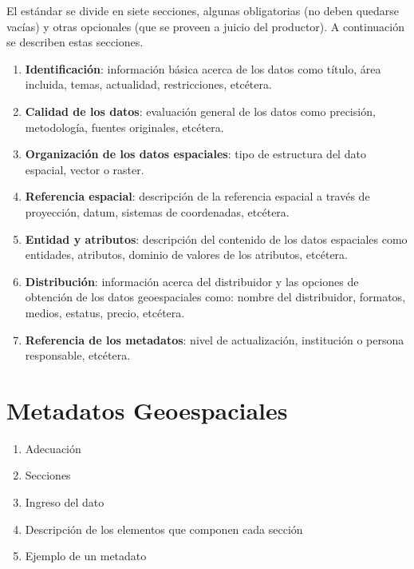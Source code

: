 \documentclass[twoside]{book}
\begin{document}
El estándar se divide en siete secciones, algunas obligatorias (no deben quedarse vacías) y otras opcionales (que se proveen a juicio del productor). A continuación se describen estas secciones. 
\begin{enumerate}
\item \textbf{Identificación}: información básica acerca de los datos como título, área incluida, temas, actualidad, restricciones, etcétera.
\item \textbf{Calidad de los datos}: evaluación general de los datos como precisión, metodología, fuentes originales, etcétera.
\item \textbf{Organización de los datos espaciales}: tipo de estructura del dato espacial, vector o raster.
\item \textbf{Referencia espacial}: descripción de la referencia espacial a través de proyección, datum, sistemas de coordenadas, etcétera.
\item \textbf{Entidad y atributos}: descripción del contenido de los datos espaciales como entidades, atributos, dominio de valores de los atributos, etcétera.
\item \textbf{Distribución}: información acerca del distribuidor y las opciones de obtención de los datos geoespaciales como: nombre del distribuidor, formatos, medios, estatus, precio, etcétera.
\item \textbf{Referencia de los metadatos}: nivel de actualización, institución o persona responsable, etcétera.
\end{enumerate}

\chapter{Metadatos Geoespaciales}


\begin{enumerate}
\item Adecuación
\item Secciones
\item Ingreso del dato
\item Descripción de los elementos que componen cada sección
\item Ejemplo de un metadato

\end{enumerate}
\end{document}
